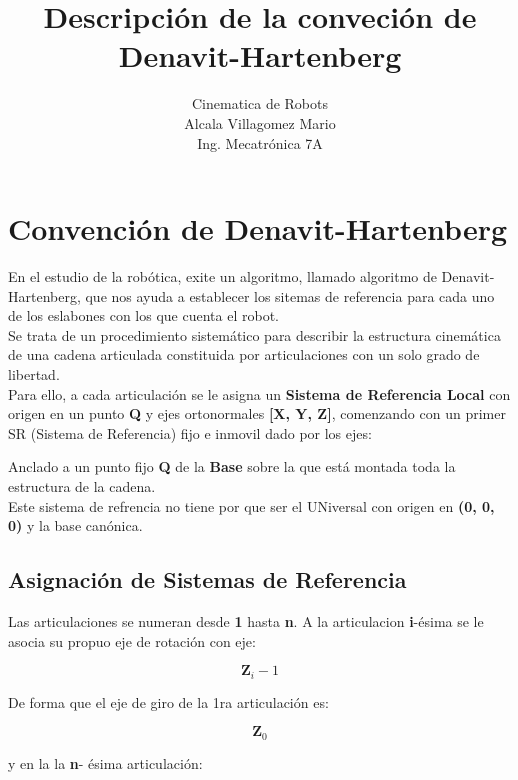 \documentclass[letter,openright,12pt,spanish]{report}
\title{\textbf{Descripci\'on de la conveci\'on de Denavit-Hartenberg}}
\author{Cinematica de Robots\\
		Alcala Villagomez Mario\\
		Ing. Mecatr\'onica 7A}
\date{}
\begin{document}
\maketitle

\section{Convenci\'on de Denavit-Hartenberg}

En el estudio de la rob\'otica, exite un algoritmo, llamado algoritmo de Denavit-Hartenberg, que nos ayuda a establecer los sitemas de referencia para cada uno de los eslabones con los que cuenta el robot.\\
Se trata de un procedimiento sistem\'atico para describir la estructura cinem\'atica de una cadena articulada constituida por articulaciones con un solo grado de libertad.\\
Para ello, a cada articulaci\'on se le asigna un \textbf{Sistema de Referencia Local} con origen en un punto \textbf{Q} y ejes ortonormales \textbf{[X, Y, Z]}, comenzando con un primer SR (Sistema de Referencia) fijo e inmovil dado por los ejes:

\begin{displaymath}
[\textbf{X}_0, \textbf{Y}_0, \textbf{Z}_0]
\end{displaymath} 
Anclado a un punto fijo \textbf{Q} de la \textbf{Base} sobre la que est\'a montada toda la estructura de la cadena.\\
Este sistema de refrencia no tiene por que ser el UNiversal con origen en \textbf{(0, 0, 0)} y la base can\'onica.

\subsection{Asignaci\'on de Sistemas de Referencia}

Las articulaciones se numeran desde \textbf{1} hasta \textbf{n}. A la articulacion \textbf{i}-\'esima se le asocia su propuo eje de rotaci\'on con eje:

\begin{displaymath}
\textbf{Z}_i-1
\end{displaymath}

De forma que el eje de giro de la 1ra articulaci\'on es:

\begin{displaymath}
\textbf{Z}_0
\end{displaymath}

y en la la \textbf{n}- \'esima articulaci\'on:
\end{document}
